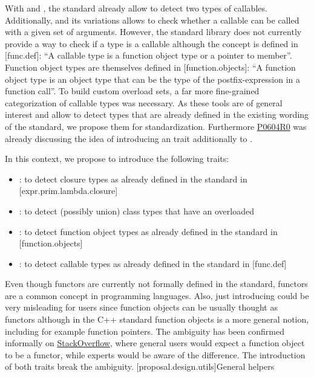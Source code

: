 \documentclass[ebook,10pt,oneside,openany,final]{memoir}
\begin{document}
With  and , the standard already allow to detect two types of callables. Additionally,  and its variations allows to check whether a callable can be called with a given set of arguments. However, the standard library does not currently provide a way to check if a type is a callable although the concept is defined in [func.def]: ``A callable type is a function object type or a pointer to member''. Function object types are themselves defined in [function.objects]: ``A function object type is an object type that can be the type of the postfix-expression in a function call''. To build custom overload sets, a far more fine-grained categorization of callable types was necessary. As these tools are of general interest and allow to detect types that are already defined in the existing wording of the standard, we propose them for standardization. Furthermore \href{http://www.open-std.org/jtc1/sc22/wg21/docs/papers/2017/p0604r0.html}{P0604R0} was already discussing the idea of introducing an  trait additionally to .

In this context, we propose to introduce the following traits:
\begin{itemize}
\item {}: to detect closure types as already defined in the standard in [expr.prim.lambda.closure]
\item {}: to detect (possibly union) class types that have an overloaded 
\item {}: to detect function object types as already defined in the standard in [function.objects]
\item {}: to detect callable types as already defined in the standard in [func.def]
\end{itemize}

Even though functors are currently not formally defined in the standard, functors are a common concept in programming languages. Also, just introducing  could be very misleading for users since function objects can be usually thought as functors although in the C++ standard function objects is a more general notion, including for example function pointers. The ambiguity has been confirmed informally on \href{https://stackoverflow.com/q/49503229}{StackOverflow}, where general users would expect a function object to be a functor, while experts would be aware of the difference. The introduction of both traits break the ambiguity.
[proposal.design.utils]{General helpers}
\end{document}
